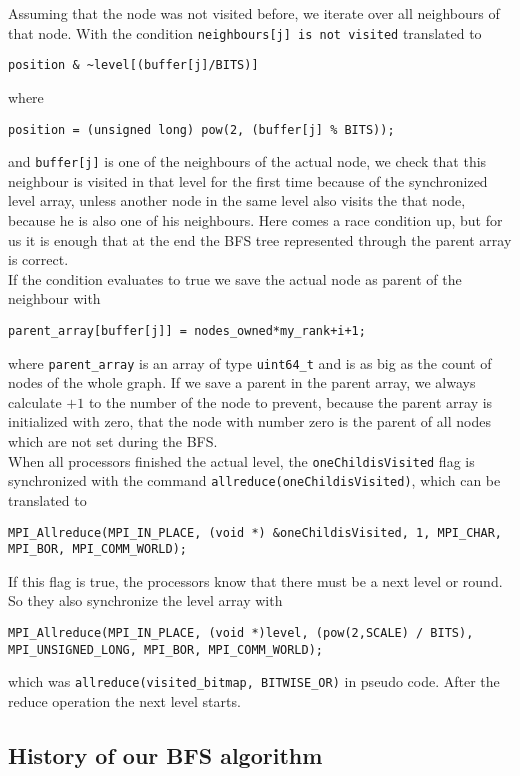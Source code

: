 \documentclass[12pt,a4paper]{article}
\begin{document}
Assuming that the node was not visited before, we iterate over all neighbours of that node. With the condition \lstinline{neighbours[j] is not visited} translated to
\begin{lstlisting}
position & ~level[(buffer[j]/BITS)]
\end{lstlisting}
where
\begin{lstlisting}
position = (unsigned long) pow(2, (buffer[j] % BITS));
\end{lstlisting}
and \lstinline{buffer[j]} is one of the neighbours of the actual node, we check that this neighbour is visited in that level for the first time because of the synchronized level array, unless another node in the same level also visits the that node, because he is also one of his neighbours. Here comes a race condition up, but for us it is enough that at the end the BFS tree represented through the parent array is correct.\\
If the condition evaluates to true we save the actual node as parent of the neighbour with
\begin{lstlisting}
parent_array[buffer[j]] = nodes_owned*my_rank+i+1;
\end{lstlisting}
where \lstinline{parent_array} is an array of type \lstinline{uint64_t} and is as big as the count of nodes of the whole graph. If we save a parent in the parent array, we always calculate \(+1\) to the number of the node to prevent, because the parent array is initialized with zero, that the node with number zero is the parent of all nodes which are not set during the BFS.\\
When all processors finished the actual level, the \lstinline{oneChildisVisited} flag is synchronized with the command \lstinline{allreduce(oneChildisVisited)}, which can be translated to
\begin{lstlisting}
MPI_Allreduce(MPI_IN_PLACE, (void *) &oneChildisVisited, 1, MPI_CHAR, MPI_BOR, MPI_COMM_WORLD);
\end{lstlisting}
If this flag is true, the processors know that there must be a next level or round. So they also synchronize the level array with
\begin{lstlisting}
MPI_Allreduce(MPI_IN_PLACE, (void *)level, (pow(2,SCALE) / BITS), MPI_UNSIGNED_LONG, MPI_BOR, MPI_COMM_WORLD);
\end{lstlisting}
which was \lstinline{allreduce(visited_bitmap, BITWISE_OR)} in pseudo code. After the reduce operation the next level starts.

\subsection{History of our BFS algorithm}
\end{document}
